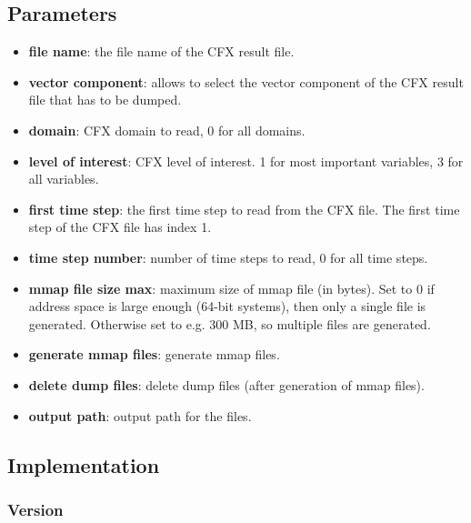 \subsection{Parameters}
\begin{itemize}

\item
  \textbf{file name}: the file name of the CFX result file.

\item
  \textbf{vector component}: allows to select the vector component of the CFX result file that has to be dumped.

\item
  \textbf{domain}: CFX domain to read, 0 for all domains.

\item
  \textbf{level of interest}: CFX level of interest. 1 for most important variables, 3 for all variables.

\item
  \textbf{first time step}: the first time step to read from the CFX file. The first time step of the CFX file has index 1.

\item
  \textbf{time step number}: number of time steps to read, 0 for all time steps.

\item
  \textbf{mmap file size max}: maximum size of mmap file (in bytes). Set to 0 if address space is large enough (64-bit systems), then only a single file is generated. Otherwise set to e.g. 300 MB, so multiple files are generated.

\item
  \textbf{generate mmap files}: generate mmap files.

\item
  \textbf{delete dump files}: delete dump files (after generation of mmap files).

\item
  \textbf{output path}: output path for the files.

\end{itemize}


\subsection{Implementation}


\subsubsection{Version}


